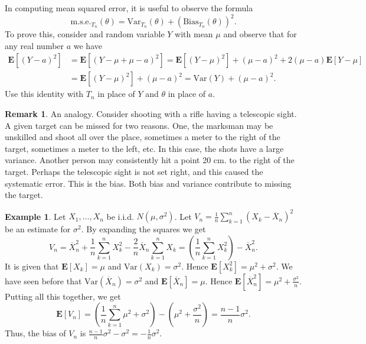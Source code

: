 \documentclass[preprint,  11pt]{amsart}
\theoremstyle{plain} %
\theoremstyle{definition} %
\newtheorem{remark}[theorem]{Remark}
\newtheorem{example}[theorem]{Example}
\begin{document}
In computing mean squared error, it is useful to observe the formula
$$
\mbox{m.s.e.}_{T_{n}}(\theta) = \mbox{Var}_{T_{n}}(\theta) + \left(\mbox{Bias}_{T_{n}}(\theta)\right)^{2}.
$$
To prove this, consider and random variable $Y$ with mean $\mu$ and observe that for any real number $a$ we have
\begin{align*}
\mathbf{E}[(Y-a)^{2}] &=\mathbf{E}[(Y-\mu+\mu-a)^{2}] = \mathbf{E}[(Y-\mu)^{2}]+(\mu-a)^{2}+2(\mu-a)\mathbf{E}[Y-\mu] \\
&= \mathbf{E}[(Y-\mu)^{2}]+(\mu-a)^{2} = \mbox{Var}(Y) + (\mu-a)^{2}.
\end{align*}
Use this identity with $T_{n}$ in place of $Y$ and $\theta$ in place of $a$.

\begin{remark} An analogy. Consider shooting with a rifle having a telescopic sight. A given target can be missed for two reasons. One, the marksman may be unskilled and shoot all over the place, sometimes a meter to the right of the target, sometimes a meter to the left, etc. In this case, the shots have a large variance. Another person may consistently hit a point 20 cm. to the right of the target. Perhaps the telescopic sight is not set right, and this caused the systematic error. This is the bias. Both bias and variance contribute to missing the target. 
\end{remark}


\begin{example} Let $X_{1},\ldots ,X_{n}$ be i.i.d. $N(\mu,{\sigma}^{2})$. Let $V_{n}=\frac{1}{n}\sum_{k=1}^{n}(X_{k}-\overline{X}_{n})^{2}$ be an estimate for ${\sigma}^{2}$. By expanding the squares we get
$$
V_{n}=\overline{X}_{n}^{2}+\frac{1}{n}\sum_{k=1}^{n}X_{k}^{2} -\frac{2}{n}\overline{X}_{n}\sum_{k=1}^{n}X_{k} = \left(\frac{1}{n}\sum_{k=1}^{n}X_{k}^{2} \right)-\overline{X}_{n}^{2}.
$$ 
It is given that $\mathbf{E}[X_{k}]=\mu$ and $\mbox{Var}(X_{k})={\sigma}^{2}$. Hence $\mathbf{E}[X_{k}^{2}]=\mu^{2}+{\sigma}^{2}$. We have seen before that $\mbox{Var}(\overline{X}_{n})={\sigma}^{2}$ and $\mathbf{E}[\overline{X}_{n}]=\mu$.  Hence $\mathbf{E}[\overline{X}_{n}^{2}]=\mu^{2}+\frac{{\sigma}^{2}}{n}$. Putting all this together, we get
$$
\mathbf{E}\left[V_{n} \right] = \left( \frac{1}{n}\sum_{k=1}^{n}\mu^{2}+{\sigma}^{2} \right) - \left(\mu^{2}+\frac{{\sigma}^{2}}{n}\right)  = \frac{n-1}{n}{\sigma}^{2}.
$$
Thus, the bias of $V_{n}$ is $\frac{n-1}{n}{\sigma}^{2}-{\sigma}^{2}=-\frac{1}{n}{\sigma}^{2}$.
\end{example}
\end{document}
